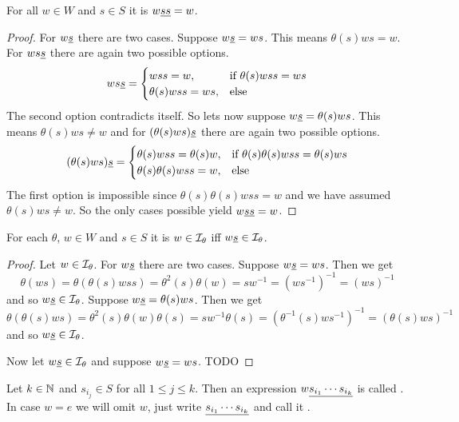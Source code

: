 \begin{lemm}
	For all $w \in W$ and $s \in S$ it is $w \underline{ss} = w$.

	\begin{proof}
		For $w \underline{s}$ there are two cases. Suppose $w \underline{s} = ws$. This means $\theta(s)ws = w$. For $ws \underline{s}$ there are again two possible options.
		$$ ws \underline{s} = \begin{cases}
			wss = w, & \textrm{if } \theta(s)wss = ws \\
			\theta(s)wss = ws, & \textrm{else} \\
		\end{cases} $$
		The second option contradicts itself. So lets now suppose $w \underline{s} = \theta(s)ws$. This means $\theta(s)ws \neq w$ and for $(\theta(s)ws) \underline{s}$ there are again two possible options.
		$$ (\theta(s)ws) \underline{s} = \begin{cases}
			\theta(s)wss = \theta(s)w, & \textrm{if } \theta(s) \theta(s) w ss = \theta(s) w s \\
			\theta(s)\theta(s)wss = w, & \textrm{else} \\
		\end{cases} $$
		The first option is impossible since $\theta(s) \theta(s) w ss = w$ and we have assumed $\theta(s)ws \neq w$. So the only cases possible yield $w \underline{s} \underline{s} = w$.
	\end{proof}
\end{lemm}

\begin{prop}
	For each $\theta$, $w \in W$ and $s \in S$ it is $w \in \mathcal{I}_{\theta}$ iff $w \underline{s} \in \mathcal{I}_{\theta}$.

	\begin{proof}
		Let $w \in \mathcal{I}_{\theta}$. For $w \underline{s}$ there are two cases. Suppose $w \underline{s} = ws$. Then we get
		$$ \theta(ws) = \theta(\theta(s)wss) = \theta^2(s) \theta(w) = sw^{-1} = (ws^{-1})^{-1} = (ws)^{-1} $$
		and so $w \underline{s} \in \mathcal{I}_{\theta}$. Suppose $w \underline{s} = \theta(s)ws$. Then we get
		$$ \theta(\theta(s)ws) = \theta^2(s) \theta(w) \theta(s) = sw^{-1}\theta(s) = (\theta^{-1}(s)ws^{-1})^{-1} = (\theta(s)ws)^{-1} $$
		and so $w \underline{s} \in \mathcal{I}_{\theta}$.

		Now let $w \underline{s} \in \mathcal{I}_{\theta}$ and suppose $w \underline{s} = ws$. TODO
	\end{proof}
\end{prop}

\begin{defi}
	Let $k \in \mathbb{N}$ and $s_{i_j} \in S$ for all $1 \leq j \leq k$. Then an expression $w \underline{s_{i_1} \cdots s_{i_k}}$ is called . In case $w = e$ we will omit $w$, just write $\underline{s_{i_1} \cdots s_{i_k}}$ and call it .
\end{defi}


